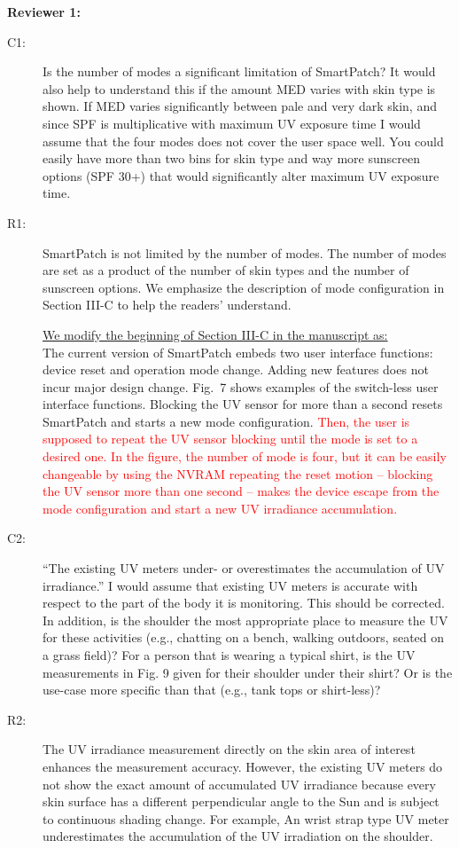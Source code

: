 \documentclass[onecolumn]{IEEEconf}
\begin{document}
\setlength{\parindent}{0cm}
\textbf{Reviewer 1:}
\begin{description}
\item [C1: ] Is the number of modes a significant limitation of SmartPatch? It would also help to understand this if the amount MED varies with skin type is shown. If MED varies significantly between pale and very dark skin, and since SPF is multiplicative with maximum UV exposure time I would assume that the four modes does not cover the user space well. You could easily have more than two bins for skin type and way more sunscreen options (SPF 30+) that would significantly alter maximum UV exposure time.  
\item [R1: ] SmartPatch is not limited by the number of modes. The number of modes are set as a product of the number of skin types and the number of sunscreen options. We emphasize the description of mode configuration in Section III-C to help the readers' understand.

\underline{We modify the beginning of Section III-C in the manuscript as:}\\
The current version of SmartPatch embeds two user interface functions: device reset and operation mode change.
Adding new features does not incur major design change.
Fig.~7 shows examples of the switch-less user interface functions.
Blocking the UV sensor for more than a second resets SmartPatch and starts a new mode configuration.
\textcolor{red}{Then, the user is supposed to repeat the UV sensor blocking until the mode is set to a desired one. In the figure, the number of mode is four, but it can be easily changeable by using the NVRAM
repeating the reset motion -- blocking the UV sensor more than one second -- makes the device escape from the mode configuration and start a new UV irradiance accumulation.}~\\

\item [C2: ] ``The existing UV meters under- or overestimates the accumulation of UV irradiance.'' I would assume that existing UV meters is accurate with respect to the part of the body it is monitoring. This should be corrected. In addition, is the shoulder the most appropriate place to measure the UV for these activities (e.g., chatting on a bench, walking outdoors, seated on a grass field)? For a person that is wearing a typical shirt, is the UV measurements in Fig. 9 given for their shoulder under their shirt? Or is the use-case more specific than that (e.g., tank tops or shirt-less)?
\item [R2: ] The UV irradiance measurement directly on the skin area of interest enhances the measurement accuracy. However, the existing UV meters do not show the exact amount of accumulated UV irradiance because every skin surface has a different perpendicular angle to the Sun and is subject to continuous shading change. For example, An wrist strap type UV meter underestimates the accumulation of the UV irradiation on the shoulder. 
~\\


\end{description}
\end{document}
